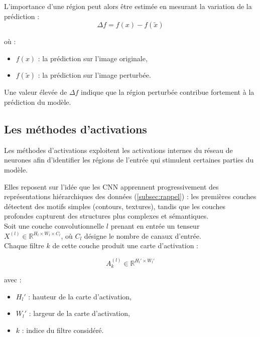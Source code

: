 \documentclass{ir}
\begin{document}
L'importance d'une région peut alors être estimée en mesurant la variation de la prédiction :
\begin{equation}
\Delta f = f(x) - f(\tilde{x})
\end{equation}

où :
\begin{itemize}
    \item $f(x)$ : la prédiction sur l'image originale,
    \item $f(\tilde{x})$ : la prédiction sur l'image perturbée.\\
\end{itemize}

Une valeur élevée de $\Delta f$ indique que la région perturbée contribue fortement à la prédiction du modèle.
\cite{zeiler2014visualizing}

\subsection{Les méthodes d'activations}\label{subsec:activation}

Les méthodes d'activations exploitent les activations internes du réseau de neurones afin d'identifier les régions de l'entrée qui stimulent certaines parties du modèle.

Elles reposent sur l'idée que les CNN apprennent progressivement des représentations hiérarchiques des données (\ref{subsec:rappel}) : les premières couches détectent des motifs simples (contours, textures), tandis que les couches profondes capturent des structures plus complexes et sémantiques.\\

Soit une couche convolutionnelle $l$ prenant en entrée un tenseur
$X^{(l)} \in \mathbb{R}^{H_l \times W_l \times C_l}$,
où $C_l$ désigne le nombre de canaux d'entrée.\\

Chaque filtre $k$ de cette couche produit une carte d'activation :

\begin{equation}
A_k^{(l)} \in \mathbb{R}^{H_l' \times W_l'}
\end{equation}

avec :
\begin{itemize}
    \item $H_l'$ : hauteur de la carte d'activation,
    \item $W_l'$ : largeur de la carte d'activation,
    \item $k$ : indice du filtre considéré.\\
\end{itemize}
\end{document}
